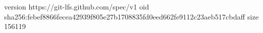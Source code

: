 version https://git-lfs.github.com/spec/v1
oid sha256:febef8866fecea42939f805e27b1708835fd0eed662fe9112c23aeb517cbdaff
size 156119
